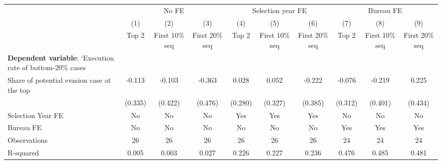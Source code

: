 {
\def\sym#1{\ifmmode^{#1}\else\(^{#1}\)\fi}
\begin{tabular}{l*{9}{c}}
\toprule
            &\multicolumn{3}{c}{No FE}                                        &\multicolumn{3}{c}{Selection year FE}                            &\multicolumn{3}{c}{Bureau FE}                                    \\\cmidrule(lr){2-4}\cmidrule(lr){5-7}\cmidrule(lr){8-10}
            &\multicolumn{1}{c}{(1)}&\multicolumn{1}{c}{(2)}&\multicolumn{1}{c}{(3)}&\multicolumn{1}{c}{(4)}&\multicolumn{1}{c}{(5)}&\multicolumn{1}{c}{(6)}&\multicolumn{1}{c}{(7)}&\multicolumn{1}{c}{(8)}&\multicolumn{1}{c}{(9)}\\
            &\multicolumn{1}{c}{Top 2}&\multicolumn{1}{c}{First 10\% seq}&\multicolumn{1}{c}{First 20\% seq}&\multicolumn{1}{c}{Top 2}&\multicolumn{1}{c}{First 10\% seq}&\multicolumn{1}{c}{First 20\% seq}&\multicolumn{1}{c}{Top 2}&\multicolumn{1}{c}{First 10\% seq}&\multicolumn{1}{c}{First 20\% seq}\\
\midrule
\textbf{Dependent variable}: `Execution rate of bottom-20\% cases&                     &                     &                     &                     &                     &                     &                     &                     &                     \\
\addlinespace
Share of potential evasion case at the top&      -0.113         &      -0.103         &      -0.363         &       0.028         &       0.052         &      -0.222         &      -0.076         &      -0.219         &       0.225         \\
            &     (0.335)         &     (0.422)         &     (0.476)         &     (0.280)         &     (0.327)         &     (0.385)         &     (0.312)         &     (0.401)         &     (0.434)         \\
\midrule
Selection Year FE&          No         &          No         &          No         &         Yes         &         Yes         &         Yes         &          No         &          No         &          No         \\
Bureau FE   &          No         &          No         &          No         &          No         &          No         &          No         &         Yes         &         Yes         &         Yes         \\
Observations&          26         &          26         &          26         &          26         &          26         &          26         &          24         &          24         &          24         \\
R-squared   &       0.005         &       0.003         &       0.027         &       0.226         &       0.227         &       0.236         &       0.476         &       0.485         &       0.481         \\
\bottomrule
\end{tabular}
}
